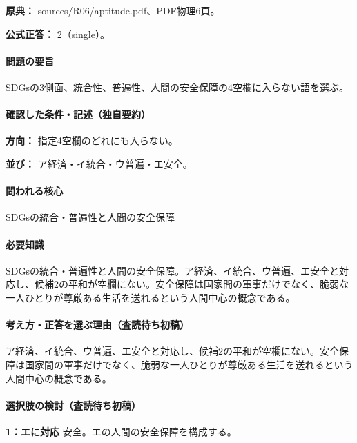 \noindent\textbf{原典：} sources/R06/aptitude.pdf、PDF物理6頁。

\textbf{公式正答：} 2（single）。

\paragraph{問題の要旨} SDGsの3側面、統合性、普遍性、人間の安全保障の4空欄に入らない語を選ぶ。

\paragraph{確認した条件・記述（独自要約）}\mbox{}\par

\noindent\textbf{方向：} 指定4空欄のどれにも入らない。\par

\noindent\textbf{並び：} ア経済・イ統合・ウ普遍・エ安全。\par

\paragraph{問われる核心} SDGsの統合・普遍性と人間の安全保障

\paragraph{必要知識} SDGsの統合・普遍性と人間の安全保障。ア経済、イ統合、ウ普遍、エ安全と対応し、候補2の平和が空欄にない。安全保障は国家間の軍事だけでなく、脆弱な一人ひとりが尊厳ある生活を送れるという人間中心の概念である。

\paragraph{考え方・正答を選ぶ理由（査読待ち初稿）} ア経済、イ統合、ウ普遍、エ安全と対応し、候補2の平和が空欄にない。安全保障は国家間の軍事だけでなく、脆弱な一人ひとりが尊厳ある生活を送れるという人間中心の概念である。

\paragraph{選択肢の検討（査読待ち初稿）}\mbox{}\par

\noindent\textbf{1：エに対応} 安全。エの人間の安全保障を構成する。\par

